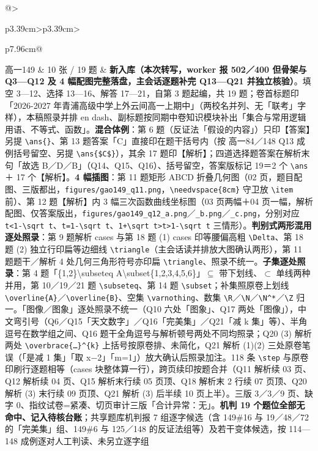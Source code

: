 \documentclass[a4paper,11pt]{article}
\begin{document}
\begin{xltabular}{\textwidth}{@{}>{\raggedright\arraybackslash}p{3.39cm}>{\centering\arraybackslash}p{3.39cm}>{\raggedright\arraybackslash}p{7.96cm}@{}}
高一149 & 10 张 / 19 题 & \textbf{新入库（本次转写，worker 报 502／400 但骨架与 Q3---Q12 及 4 幅配图完整落盘，主会话逐题补完 Q13---Q21 并独立核验）}。填空 3---12、选择 13---16、解答 17---21，自第 3 题起编，共 19 题；卷首标题印「2026-2027 年青浦高级中学上外云间高一上期中」（两校名并列、无「联考」字样），本稿照录并排 en dash、副标题按同期中卷知识模块补出「集合与常用逻辑用语、不等式、函数」。\textbf{混合体例}：第 6 题（反证法「假设的内容」）只印【答案】另提 \texttt{\textbackslash{}ans\{\}}、第 13 题答案「C」直接印在题干括号内（按 高一84／148 Q13 成例括号留空、另提 \texttt{\textbackslash{}ans\{\$C\$\}}），其余 17 题印【解析】；四道选择题答案在解析末句「故选 B／D／B」（Q14、Q15、Q16）、括号留空，答案版标记 19＝2 个 \texttt{\textbackslash{}ans} ＋ 17 个【解析】。\textbf{4 幅插图}：第 11 题矩形 ABCD 折叠几何图（02 页，题目配图、三版都出，\texttt{figures/\allowbreak{}gao149\_q11.png}，\texttt{\textbackslash{}needvspace\{8cm\}} 守卫放 \texttt{\textbackslash{}item} 前）、第 12 题【解析】内 3 幅三次函数曲线坐标图（03 页两幅＋04 页一幅，解析配图、仅答案版出，\texttt{figures/\allowbreak{}gao149\_q12\_a.png}／\texttt{\_b.png}／\texttt{\_c.png}，分别对应 \texttt{t\textless{}1-\allowbreak{}\textbackslash{}sqrt\ t}、\texttt{t=1-\allowbreak{}\textbackslash{}sqrt\ t}、\texttt{1+\textbackslash{}sqrt\ t\textgreater{}t\textgreater{}1-\allowbreak{}\textbackslash{}sqrt\ t} 三情形）。\textbf{判别式两形混用逐处照录}：第 9 题解析 cases 与第 18 题 (1) cases 印等腰偏高粗 \texttt{\textbackslash{}Delta}、第 18 题 (2) 独立行印扁等边细线 \texttt{\textbackslash{}triangle}（主会话读并排放大图确认两形），第 11 题题干／解析 4 处几何三角形符号亦印扁 \texttt{\textbackslash{}triangle}、照录不统一。\textbf{子集逐处照录}：第 4 题「\{1,2\}\textbackslash subseteq A\textbackslash subset\{1,2,3,4,5,6\}」$\subseteq$ 带下划线、$\subset$ 单线两种并用，第 10／19／21 题 \texttt{\textbackslash{}subseteq}、第 14 题 \texttt{\textbackslash{}subset}；补集照原卷上划线 \texttt{\textbackslash{}overline\{A\}}／\texttt{\textbackslash{}overline\{B\}}、空集 \texttt{\textbackslash{}varnothing}、数集 \texttt{\textbackslash{}R}／\texttt{\textbackslash{}N}／\texttt{\textbackslash{}N\^{}*}／\texttt{\textbackslash{}Z} 归一。「图像／图象」逐处照录不统一（Q10 六处「图象」、Q17 两处「图像」），中文弯引号（Q6／Q15「天文数字」／Q16「完美集」／Q21「减 k 集」等）、半角逗号在数学组之间、Q16 题干全角逗号与解析顿号两处不同均照录；Q20 (3) 解析两处 \texttt{\textbackslash{}overbrace\{…\}\^{}\{k\}} 上括号按原卷排、未简化，Q21 解析 (1)(2) 三处原卷笔误（「是减 1 集」「取 x−2」「m=1」）放大确认后照录加注。118 条 \texttt{\textbackslash{}step} 与原卷印刷行逐题相等（cases 块整体算一行），跨页续印按题合并（Q11 解析续 03 页、Q12 解析续 04 页、Q15 解析末行续 05 页顶、Q18 解析末 2 行续 07 页顶、Q20 解析 (3) 末行续 09 页顶、Q21 解析 (3) 后半续 10 页上半）。三版 3／3／9 页、缺字 0、指纹试卷=紧凑、切页审计三版「合计异常：无」。\textbf{机判 19 个题位全部无命中、记入待核台账}；共享题库机判报 7 组逐字候选（含 149\#16 与 19／48／72 的「完美集」组、149\#6 与 125／148 的反证法组等）及若干变体候选，按 114---148 成例逐对人工判读、未另立逐字组 \\ \addlinespace[1pt]

\end{xltabular}
\end{document}
